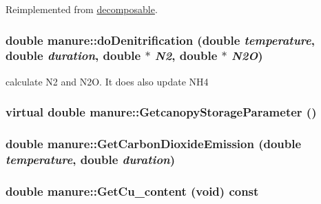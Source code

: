 Reimplemented from \hyperlink{classdecomposable_ab15f1f4e93e58810887029648be0ec31}{decomposable}.\hypertarget{classmanure_a9005bcd6e277a3f993b1c67b90edfb35}{
\subsubsection[{doDenitrification}]{\setlength{\rightskip}{0pt plus 5cm}double manure::doDenitrification (double {\em temperature}, \/  double {\em duration}, \/  double $\ast$ {\em N2}, \/  double $\ast$ {\em N2O})}}
\label{classmanure_a9005bcd6e277a3f993b1c67b90edfb35}
calculate N2 and N2O. It does also update NH4 \hypertarget{classmanure_aa5a3178bfb7d4f5f87fe41d1d8221ed5}{
\subsubsection[{GetcanopyStorageParameter}]{\setlength{\rightskip}{0pt plus 5cm}virtual double manure::GetcanopyStorageParameter ()}}
\label{classmanure_aa5a3178bfb7d4f5f87fe41d1d8221ed5}
\hypertarget{classmanure_ac9206359d7b5dcdcf7c1dba31f490342}{
\subsubsection[{GetCarbonDioxideEmission}]{\setlength{\rightskip}{0pt plus 5cm}double manure::GetCarbonDioxideEmission (double {\em temperature}, \/  double {\em duration})}}
\label{classmanure_ac9206359d7b5dcdcf7c1dba31f490342}
\hypertarget{classmanure_af7b3d4f63546db980e899016faeeb500}{
\subsubsection[{GetCu\_\-content}]{\setlength{\rightskip}{0pt plus 5cm}double manure::GetCu\_\-content (void) const}}
